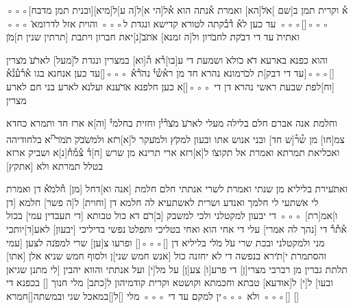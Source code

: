 
\begin{aramaictext}
◦◦◦[\hspace{1.5em}ובנית תמן מדבח]א֯ וקרית תמן ב[שם ]א̇ל[הא] ואמרת א֯נתה הוא
א֯ל[הי א]ל[ה ע]ל[מיא] ◦◦◦[\hspace*{1.5em}]◦◦◦ עד כען לא֯ ד֯ב֯קתה לטורא קדישא ונגדת
ל◦◦◦ והוית אזל לדרומא̇̇ ◦◦◦ ואתית̇ עד די דב̇קת לחב̇רון ול[ה זמנא] 
א̇ת̇ב̇[נ]יאת חברון ויתבת
[תרתין שנין ת]מ̇ן \vacat

והוא כפנא בארעא ד̇א כ̇ולא̇ ושמעת די ע[בו]ר֯א 
ה֯[וא] במצרין ונגדת
ל̇[מעל] לאר̇̇ע̇ מ̇צרין [\hspace*{1.5em}]◦◦◦[\hspace*{1.5em}עד די דבק]ת לכ̇רמונא נהרא חד מן 
רא֯ש֯י֯ נה̇ר֯א֯ ◦◦◦[\hspace*{1.5em}]עד כען אנחנא בגו א֯ר֯ע֯נ֯א֯ [וח]לפת שבעת ראשי נהרא דן 
די
◦◦◦[\hspace*{1.5em}]א כען חלפנא א̇ר̇ענא ועלנא לארע בני חם לארע מצרין

\vacat
וחלמת אנה אברם חלם בלילה מעלי לאר̇ע̇ מ̇צ̇ר֯י֯ן וחזית בחלמי֯ [וה]א 
ארז חד ותמרא
כחדא צמ[חו] מן ש֯ר֯[ש חד] ובני אנוש אתו ובעון למק̇ץ ולמ̇עקר ל[א]ר̇זא 
ולמ̇ש̇ב̇ק̇ ת̇מ̇ר̇\textsuperscript{ת}א בלחודיהה
ואכליאת תמרתא ואמרת אל תקוצ̇ו ל[א]רזא ארי תרינא מן שרש [ח]ד֯ 
צ֯מ֯ח֯[נ]א ושביק ארזא בטלל תמרתא
ולא [אתקץ] \vacat

ואת̇עירת בליליא מן שנתי ואמרת לשרי אנתתי חלם 
חלמת [אנה וא]דחל [מן] ח֯למ̇̇א֯ דן ואמרת לי א̇שתעי לי חלמך ואנדע ושרית 
לאשתעיא לה חלמא דן
[וחוית] ל[ה פשר] חלמא [דן ו]אמ[רת] ◦◦◦ די יבעון למקטלני ולכי למשבק
[ב]ר̇ם דא כול טבותא
[די תעבדין עמי] בכול א֯ת֯ר֯ די [נהך לה אמרי] עלי די אחי הוא ואחי בטליכי
ותפלט̇ נפשי בדיליכי
[\hspace*{1.5em}יבעון] לאע[ד]יותכי מני ולמקטלני ובכת שרי ע̇ל מ̇לי בליליא דן
[\hspace*{1.5em}]◦◦◦[\hspace{8em}] ופרעו צ[ען\hspace*{1.5em}] שרי למפ̇נה לצען
[עמי והסתמרת י]ת̇ירא בנפשה די לא יחזנה כול [אנש חמש שני]ן ולסוף
חמש שניא אלן
[\hspace*{1.5em}אתו] תלתת גברין מן רברבי מצרי[ן\hspace*{0.75em}] די פרע[ו] צע[ן] על מל[י] ועל
אנתתי והווא יהבין
[לי מתנן שגיאן ובעו] ל[י] ל[אודעא] טבתא וחכמתא וקושטא וקרית קודמיהון
ל[כתב] מלי חנוך
[\hspace{8em}] בכפנא די [\hspace*{1.5em}]◦◦◦ ולא ◦◦◦ין למקם עד די ◦◦◦ מלי
[\hspace{2em}]ל[\hspace*{1.5em}]במאכל שגי ובמשתה[\hspace{8em}]חמרא
\hspace*{1.5em} 
[\hspace{3em}]

\end{aramaictext}